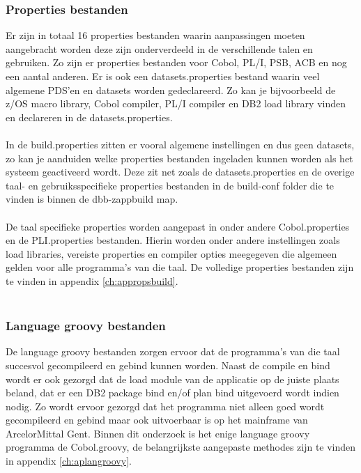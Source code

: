 \subsubsection{Properties bestanden}
Er zijn in totaal 16 properties bestanden waarin aanpassingen moeten aangebracht worden deze zijn onderverdeeld in de verschillende talen en gebruiken. Zo zijn er properties bestanden voor Cobol, PL/I, PSB, ACB en nog een aantal anderen. Er is ook een datasets.properties bestand waarin veel algemene PDS'en en datasets worden gedeclareerd. Zo kan je bijvoorbeeld de z/OS macro library, Cobol compiler, PL/I compiler en DB2 load library vinden en declareren in de datasets.properties. 
\\ \\
In de build.properties zitten er vooral algemene instellingen en dus geen datasets, zo kan je aanduiden welke properties bestanden ingeladen kunnen worden als het systeem geactiveerd wordt. Deze zit net zoals de datasets.properties en de overige taal- en gebruiksspecifieke properties bestanden in de build-conf folder die te vinden is binnen de dbb-zappbuild map. 
\\ \\
De taal specifieke properties worden aangepast in onder andere Cobol.properties en de PLI.properties bestanden. Hierin worden onder andere instellingen zoals load libraries, vereiste properties en compiler opties meegegeven die algemeen gelden voor alle programma's van die taal. De volledige properties bestanden zijn te vinden in appendix \ref{ch:appropsbuild}.
\\ \\
\subsubsection{Language groovy bestanden}
De language groovy bestanden zorgen ervoor dat de programma's van die taal succesvol gecompileerd en gebind kunnen worden. Naast de compile en bind wordt er ook gezorgd dat de load module van de applicatie op de juiste plaats beland, dat er een DB2 package bind en/of plan bind uitgevoerd wordt indien nodig. Zo wordt ervoor gezorgd dat het programma niet alleen goed wordt gecompileerd en gebind maar ook uitvoerbaar is op het mainframe van ArcelorMittal Gent. Binnen dit onderzoek is het enige language groovy programma de Cobol.groovy, de belangrijkste aangepaste methodes zijn te vinden in appendix \ref{ch:aplangroovy}.
\\ \\
